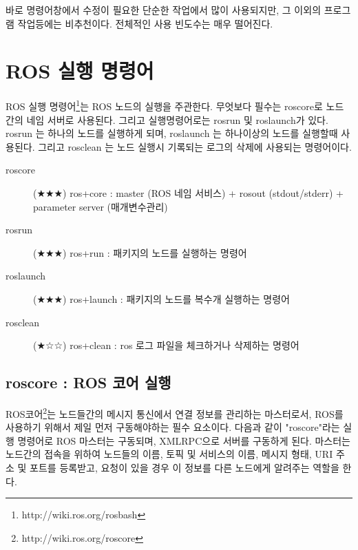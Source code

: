 \vspace{\baselineskip}
\noindent
바로 명령어창에서 수정이 필요한 단순한 작업에서 많이 사용되지만, 그 이외의 프로그램 작업등에는 비추천이다. 전체적인 사용 빈도수는 매우 떨어진다.

\section{ROS 실행 명령어}

ROS 실행 명령어\footnote{http://wiki.ros.org/rosbash}는 ROS 노드의 실행을 주관한다. 무엇보다 필수는 roscore로 노드간의 네임 서버로 사용된다. 그리고 실행명령어로는 rosrun 및 roslaunch가 있다. rosrun 는 하나의 노드를 실행하게 되며, roslaunch 는 하나이상의 노드를 실행할때 사용된다. 그리고 rosclean 는 노드 실행시 기록되는 로그의 삭제에 사용되는 명령어이다.

\vspace{\baselineskip}
\noindent
\begin{description}
\item[roscore] (★★★) ros+core : master (ROS 네임 서비스) + rosout (stdout/stderr) + parameter server (매개변수관리)
\item[rosrun] (★★★) ros+run : 패키지의 노드를 실행하는 명령어
\item[roslaunch] (★★★) ros+launch : 패키지의 노드를 복수개 실행하는 명령어
\item[rosclean] (★☆☆) ros+clean : ros 로그 파일을 체크하거나 삭제하는 명령어
\end{description}

\subsection{roscore : ROS 코어 실행}

ROS코어\footnote{http://wiki.ros.org/roscore}는 노드들간의 메시지 통신에서 연결 정보를 관리하는 마스터로서, ROS를 사용하기 위해서 제일 먼저 구동해야하는 필수 요소이다. 다음과 같이 "roscore"라는 실행 명령어로 ROS 마스터는 구동되며, XMLRPC으로 서버를 구동하게 된다. 마스터는 노드간의 접속을 위하여 노드들의 이름, 토픽 및 서비스의 이름, 메시지 형태, URI 주소 및 포트를  등록받고, 요청이 있을 경우 이 정보를 다른 노드에게 알려주는 역할을 한다. 

\setcounter{num}{0}

